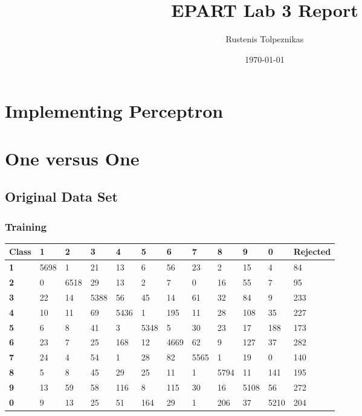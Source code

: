 \documentclass[
  a4paper,            %
  DIV=10,             %
  oneside,            %
  BCOR=5mm,           %
  parskip=half,       %
  numbers=noenddot,   %
  bibtotoc,           %
  listof=totoc        %
]{scrreprt}
\title{EPART Lab 3 Report}
\author{Rustenis Tolpeznikas}
\date{\today}
\let\oldchapter\chapter
\renewcommand{\chapter}{\par\oldchapter}
\begin{document}
\maketitle
\newpage

\chapter{Implementing Perceptron}

\chapter{One versus One}
\section{Original Data Set}
\subsection{Training}
\begin{center}
  \begin{tabular}{|p{1cm}|p{1cm}|p{1cm}|p{1cm}|p{1cm}|p{1cm}|p{1cm}|p{1cm}|p{1cm}|p{1cm}|p{1cm}|p{1.7cm}|}
    \hline
    \textbf{Class} & \textbf{1} & \textbf{2} & \textbf{3} & \textbf{4} & \textbf{5} & \textbf{6} & \textbf{7} & \textbf{8} & \textbf{9} & \textbf{0} & \textbf{Rejected} \\
    \hline
    \textbf{1} & 5698 & 1 & 21 & 13 & 6 & 56 & 23 & 2 & 15 & 4 & 84 \\
    \hline
    \textbf{2} & 0 & 6518 & 29 & 13 & 2 & 7 & 0 & 16 & 55 & 7 & 95 \\
    \hline
    \textbf{3} & 22 & 14 & 5388 & 56 & 45 & 14 & 61 & 32 & 84 & 9 & 233 \\
    \hline
    \textbf{4} & 10 & 11 & 69 & 5436 & 1 & 195 & 11 & 28 & 108 & 35 & 227 \\
    \hline
    \textbf{5} & 6 & 8 & 41 & 3 & 5348 & 5 & 30 & 23 & 17 & 188 & 173 \\
    \hline
    \textbf{6} & 23 & 7 & 25 & 168 & 12 & 4669 & 62 & 9 & 127 & 37 & 282 \\
    \hline
    \textbf{7} & 24 & 4 & 54 & 1 & 28 & 82 & 5565 & 1 & 19 & 0 & 140 \\
    \hline
    \textbf{8} & 5 & 8 & 45 & 29 & 25 & 11 & 1 & 5794 & 11 & 141 & 195 \\
    \hline
    \textbf{9} & 13 & 59 & 58 & 116 & 8 & 115 & 30 & 16 & 5108 & 56 & 272 \\
    \hline
    \textbf{0} & 9 & 13 & 25 & 51 & 164 & 29 & 1 & 206 & 37 & 5210 & 204 \\
    \hline
\end{tabular}
\end{center}
\end{document}
